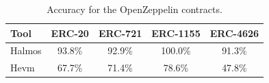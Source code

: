 \begin{table}[htb]
\centering
\begin{scriptsize}
\begin{tabular}{lcccc}
\toprule
\textbf{Tool} & \textbf{ERC-20} & \textbf{ERC-721} & \textbf{ERC-1155} & \textbf{ERC-4626} \\
\midrule
Halmos & 93.8\% & 92.9\% & 100.0\% & 91.3\% \\
Hevm & 67.7\% & 71.4\% & 78.6\% & 47.8\% \\
\bottomrule
\end{tabular}
\end{scriptsize}
\caption{Accuracy for the OpenZeppelin contracts.}
\label{tab:tool_accuracy_openzeppelin}
\end{table}
